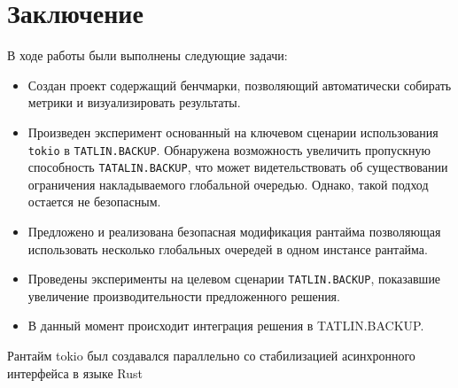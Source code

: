 
\section{Заключение}

В ходе работы были выполнены следующие задачи:

\begin{itemize}
    \item Создан проект содержащий бенчмарки, позволяющий автоматически собирать метрики и визуализировать результаты.
    \item Произведен эксперимент основанный на ключевом сценарии использования \verb|tokio| в \verb|TATLIN.BACKUP|. Обнаружена возможность увеличить пропускную способность \verb|TATALIN.BACKUP|, что может видетельствовать об существовании ограничения накладываемого глобальной очередью. Однако, такой подход остается не безопасным.
    \item Предложено и реализована безопасная модификация рантайма позволяющая использовать несколько глобальных очередей в одном инстансе рантайма.
    \item Проведены эксперименты на целевом сценарии \verb|TATLIN.BACKUP|, показавшие увеличение производительности предложенного решения.
    \item В данный момент происходит интеграция решения в TATLIN.BACKUP.
\end{itemize}

Рантайм tokio был создавался параллельно со стабилизацией асинхронного интерфейса в языке Rust
